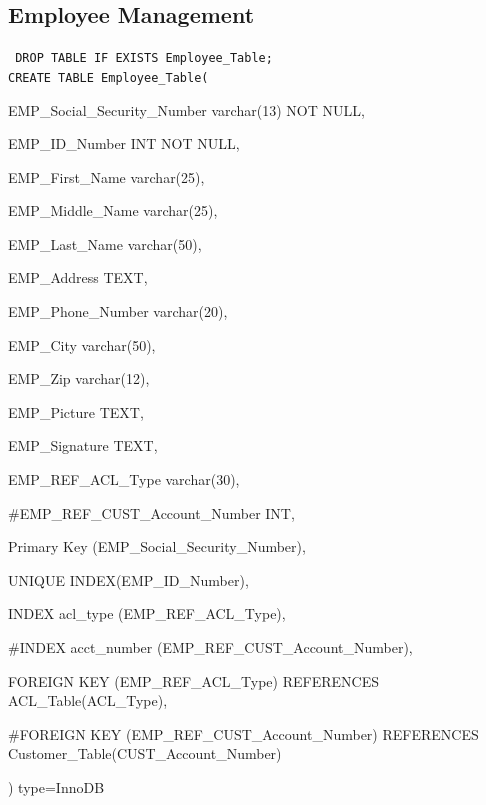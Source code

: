 \documentclass{report}
\begin{document}
        \subsection{Employee Management}
        {\tt\small
        DROP TABLE IF EXISTS Employee\_Table;\\

        CREATE TABLE Employee\_Table(
        \begin{list}{}
            \item{EMP\_Social\_Security\_Number             varchar(13) NOT NULL,}
            \item{EMP\_ID\_Number                           INT NOT NULL,}
            \item{EMP\_First\_Name                          varchar(25),}
            \item{EMP\_Middle\_Name                         varchar(25),}
            \item{EMP\_Last\_Name                           varchar(50),}
            \item{EMP\_Address                              TEXT,}
            \item{EMP\_Phone\_Number                        varchar(20),}
            \item{EMP\_City                                 varchar(50),}
            \item{EMP\_Zip                                  varchar(12),}
            \item{EMP\_Picture                              TEXT,}
            \item{EMP\_Signature                            TEXT,}
            \item{EMP\_REF\_ACL\_Type                       varchar(30),}
            \item{\#EMP\_REF\_CUST\_Account\_Number            INT,}
            \item{Primary Key (EMP\_Social\_Security\_Number),}
            \item{UNIQUE INDEX(EMP\_ID\_Number),}
            \item{INDEX acl\_type (EMP\_REF\_ACL\_Type),}
            \item{\#INDEX acct\_number (EMP\_REF\_CUST\_Account\_Number),}
            \item{FOREIGN KEY (EMP\_REF\_ACL\_Type) REFERENCES ACL\_Table(ACL\_Type),}
            \item{\#FOREIGN KEY (EMP\_REF\_CUST\_Account\_Number) REFERENCES Customer\_Table(CUST\_Account\_Number)}
        \end{list}
        ) type=InnoDB\\
        }
\end{document}
